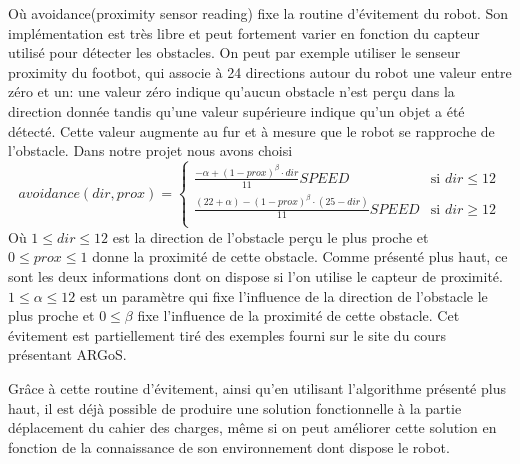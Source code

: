 \documentclass[a4paper,11pt]{report}
\begin{document}
Où avoidance(proximity sensor reading) fixe la routine d'évitement du robot. Son implémentation est très libre et peut fortement varier en fonction du capteur utilisé pour détecter les obstacles. On peut par exemple utiliser le senseur proximity du footbot, qui associe à 24 directions autour du robot une valeur entre zéro et un: une valeur zéro indique qu'aucun obstacle n'est perçu dans la direction donnée tandis qu'une valeur supérieure indique qu'un objet a été détecté. Cette valeur augmente au fur et à mesure que le robot se rapproche de l'obstacle.\cite{argosSite1} Dans notre projet nous avons choisi
\[avoidance(dir, prox)=
  \begin{cases}
      \frac{-\alpha +(1-prox)^{\beta}\cdot dir}{11}SPEED & \text{si }dir \leq 12\\
      \frac{(22+\alpha )-(1-prox)^{\beta}\cdot (25-dir)}{11}SPEED & \text{si }dir \geq 12\\
  \end{cases}
\]
Où $ 1 \leq dir \leq 12 $ est la direction de l'obstacle perçu le plus proche et \hbox{$0 \leq prox \leq 1$} donne la proximité de cette obstacle. Comme présenté plus haut, ce sont les deux informations dont on dispose si l'on utilise le capteur de proximité.  \(1 \leq \alpha \leq 12 \) est un paramètre qui fixe l'influence de la direction de l'obstacle le plus proche et \(0 \leq \beta \) fixe l'influence de la proximité de cette obstacle. Cet évitement est partiellement tiré des exemples fourni sur le site du cours présentant ARGoS.\cite{argosSite1}

Grâce à cette routine d'évitement, ainsi qu'en utilisant l'algorithme présenté plus haut, il est déjà possible de produire une solution fonctionnelle à la partie déplacement du cahier des charges, même si on peut améliorer cette solution en fonction de la connaissance de son environnement dont dispose le robot.
\end{document}
